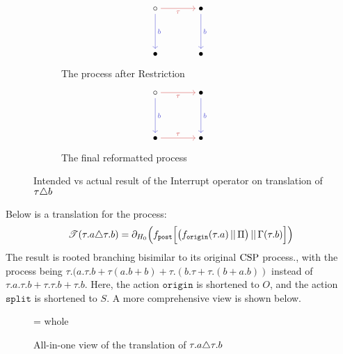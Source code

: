 \documentclass[../hons_project.tex]{subfiles}
\begin{document}
\begin{figure}[!ht]
	\centering
	\begin{subfigure}[b]{0.45\textwidth}
		\[\begin{tikzcd}[cramped, column sep=scriptsize]
				\circ && \bullet \\
				\\
				\bullet && \bullet
				\arrow["\tau"', color={rgb,255:red,214;green,92;blue,92}, from=1-1, to=1-3]
				\arrow["b", color={rgb,255:red,92;green,92;blue,214}, from=1-1, to=3-1]
				\arrow["b", color={rgb,255:red,92;green,92;blue,214}, from=1-3, to=3-3]
			\end{tikzcd}\]
		\caption{The process after Restriction}
	\end{subfigure}\hfill
	\begin{subfigure}[b]{0.45\textwidth}
		\[\begin{tikzcd}[cramped, column sep=scriptsize]
				\circ && \bullet \\
				\\
				\bullet && \bullet
				\arrow["\tau"', color={rgb,255:red,214;green,92;blue,92}, from=1-1, to=1-3]
				\arrow["b", color={rgb,255:red,92;green,92;blue,214}, from=1-1, to=3-1]
				\arrow["b", color={rgb,255:red,92;green,92;blue,214}, from=1-3, to=3-3]
				\arrow["\tau", color={rgb,255:red,214;green,92;blue,92}, from=3-1, to=3-3]
			\end{tikzcd}\]
		\caption{The final reformatted process}
	\end{subfigure}
	\caption{Intended vs actual result of the Interrupt operator on translation of $\tau \triangle b$}
	\label{fig:interrupt-c}
\end{figure}

Below is a translation for the process:
\[\mathscr{T}(\tau.a \triangle \tau.b) = \partial_{H_{0}}\Bigl(f_{\mathtt{post}}\Bigl[ \bigl(f_{\mathtt{origin}}(\tau.a) \,\vert\vert\, \Pi\bigr) \,\vert\vert\, \Gamma(\tau.b) \Bigr]\Bigr)\]
The result is rooted branching bisimilar to its original $\mathrm{CSP}$ process., with the process being $\tau.(a.\tau.b + \tau(a.b+b) + \tau.(b.\tau + \tau.(b + a.b))$ instead of $\tau.a.\tau.b + \tau.\tau.b + \tau.b$. Here, the action $\mathtt{origin}$ is shortened to $O$, and the action $\mathtt{split}$ is shortened to $S$. A more comprehensive view is shown below.

\begin{figure}[H]
	\hfuzz=\maxdimen
	\centering
	{whole}
	\caption{All-in-one view of the translation of $\tau.a \triangle \tau.b$}
\end{figure}
\end{document}
